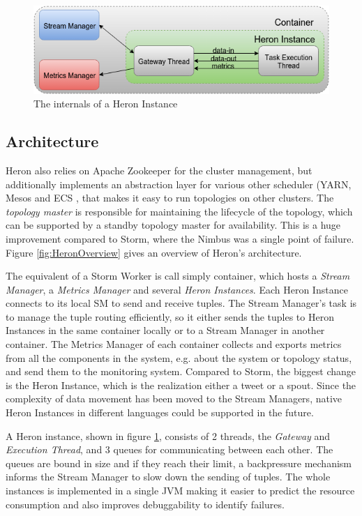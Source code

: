 \documentclass[conference]{IEEEtran}
\begin{document}
\begin{figure}
    \centering
    \includegraphics[scale=0.35]{figures/HeronInstance}
    \caption{The internals of a Heron Instance}
    \label{fig:HeronInstance}
\end{figure}

\subsection{Architecture}
\label{sec:TwitterHeronArchitecture}

Heron also relies on Apache Zookeeper for the cluster management, but additionally implements an abstraction layer for various other scheduler (YARN, Mesos and ECS \cite{Aurora, YARM}, that makes it easy to run topologies on other clusters.
The \emph{topology master} is responsible for maintaining the lifecycle of the topology, which can be supported by a standby topology master for availability.
This is a huge improvement compared to Storm, where the Nimbus was a single point of failure.
Figure \ref{fig:HeronOverview} gives an overview of Heron's architecture.

The equivalent of a Storm Worker is call simply container, which hosts a \emph{Stream Manager}, a \emph{Metrics Manager} and several \emph{Heron Instances}.
Each Heron Instance connects to its local SM to send and receive tuples.
The Stream Manager's task is to manage the tuple routing efficiently, so it either sends the tuples to Heron Instances in the same container locally or to a Stream Manager in another container.
The Metrics Manager of each container collects and exports metrics from all the components in the system, e.g. about the system or topology status, and send them to the monitoring system.
Compared to Storm, the biggest change is the Heron Instance, which is the realization either a tweet or a spout.
Since the complexity of data movement has been moved to the Stream Managers, native Heron Instances in different languages could be supported in the future.

A Heron instance, shown in figure \ref{fig:HeronInstance}, consists of 2 threads, the \emph{Gateway} and \emph{Execution Thread}, and 3 queues for communicating between each other.
The queues are bound in size and if they reach their limit, a backpressure mechanism informs the Stream Manager to slow down the sending of tuples.
The whole instances is implemented in a single JVM making it easier to predict the resource consumption and also improves debuggability to identify failures.
\end{document}

